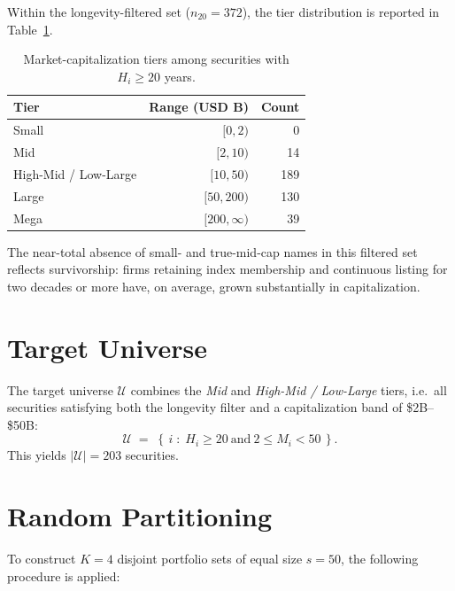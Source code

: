 \documentclass[11pt]{article}
\begin{document}
Within the longevity-filtered set ($n_{20}=372$), the tier distribution is
reported in Table~\ref{tab:tiers}.

\begin{table}[h]
\centering
\caption{Market-capitalization tiers among securities with $H_i \geq 20$ years.}
\label{tab:tiers}
\begin{tabular}{lrr}
\toprule
Tier & Range (USD B) & Count \\
\midrule
Small            & $[0, 2)$    & 0 \\
Mid              & $[2, 10)$   & 14 \\
High-Mid / Low-Large & $[10, 50)$ & 189 \\
Large            & $[50, 200)$ & 130 \\
Mega             & $[200, \infty)$ & 39 \\
\bottomrule
\end{tabular}
\end{table}

The near-total absence of small- and true-mid-cap names in this filtered
set reflects survivorship: firms retaining index membership and continuous
listing for two decades or more have, on average, grown substantially in
capitalization.

\section{Target Universe}

The target universe $\mathcal{U}$ combines the \emph{Mid} and
\emph{High-Mid / Low-Large} tiers, i.e.\ all securities satisfying both the
longevity filter and a capitalization band of \$2B--\$50B:
\begin{equation}
  \mathcal{U} \;=\; \left\{\, i \;:\; H_i \geq 20 \ \text{and} \ 2 \leq M_i < 50 \,\right\}.
\end{equation}
This yields $|\mathcal{U}| = 203$ securities.

\section{Random Partitioning}

To construct $K = 4$ disjoint portfolio sets of equal size $s = 50$, the
following procedure is applied:
\end{document}
